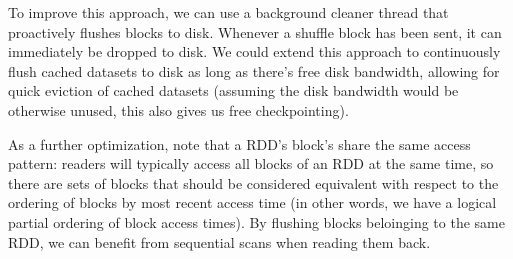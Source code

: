 \documentclass[12pt]{article}
\begin{document}
To improve this approach, we can use a background cleaner thread that
proactively flushes blocks to disk.  Whenever a shuffle block has been sent,
it can immediately be dropped to disk.  We could extend this approach to
continuously flush cached datasets to disk as long as there's free disk
bandwidth, allowing for quick eviction of cached datasets (assuming the disk
bandwidth would be otherwise unused, this also gives us free checkpointing).


As a further optimization, note that a RDD's block's share the same access
pattern: readers will typically access all blocks of an RDD at the same time,
so there are sets of blocks that should be considered equivalent with
respect to the ordering of blocks by most recent access time (in other words,
we have a logical partial ordering of block access times).
%
By flushing blocks beloinging to the same RDD, we can benefit from sequential
scans when reading them back.



%
\end{document}
